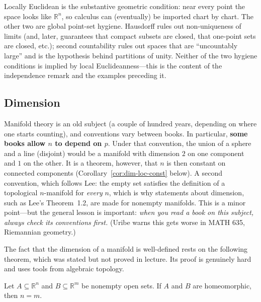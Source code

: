 \documentclass[11pt]{report}
\makeatletter
\newcounter{thmcounter}[section]
\newcommand{\thmlabel}[1]{\edef\@currentlabel{\arabic{section}.\arabic{thmcounter}}\label{#1}}
\newcommand{\leeref}[1]{\par\smallskip{\raggedleft\footnotesize\textsc{Lee}:\ #1\par}}
\makeatother
\begin{document}
\begin{rembox}\label{rem:why-these-three-conditions}
Locally Euclidean is the substantive geometric condition: near every point the space looks like $\mathbb{R}^n$, so calculus can (eventually) be imported chart by chart. The other two are global point-set hygiene. Hausdorff rules out non-uniqueness of limits (and, later, guarantees that compact subsets are closed, that one-point sets are closed, etc.); second countability rules out spaces that are ``uncountably large'' and is the hypothesis behind partitions of unity. Neither of the two hygiene conditions is implied by local Euclideanness---this is the content of the independence remark and the examples preceding it.
\end{rembox}

\subsection{Dimension}

\begin{rembox}\label{rem:conventions-dimension}
Manifold theory is an old subject (a couple of hundred years, depending on where one starts counting), and conventions vary between books. In particular, \textbf{some books allow $n$ to depend on $p$}. Under that convention, the union of a sphere and a line (disjoint) would be a manifold with dimension $2$ on one component and $1$ on the other. It is a theorem, however, that $n$ is then constant on connected components (Corollary~\ref{cor:dim-loc-const} below). A second convention, which follows Lee: the empty set satisfies the definition of a topological $n$-manifold for \emph{every} $n$, which is why statements about dimension, such as Lee's Theorem~1.2, are made for nonempty manifolds. This is a minor point---but the general lesson is important: \emph{when you read a book on this subject, always check its conventions first.} (Uribe warns this gets worse in MATH 635, Riemannian geometry.)
\end{rembox}

The fact that the dimension of a manifold is well-defined rests on the following theorem, which was stated but not proved in lecture. Its proof is genuinely hard and uses tools from algebraic topology.

\begin{thmbox}\thmlabel{thm:inv-dim}
Let $A \subseteq \mathbb{R}^n$ and $B \subseteq \mathbb{R}^m$ be nonempty open sets. If $A$ and $B$ are homeomorphic, then $n = m$.
\leeref{Theorem 1.2 (proved as Theorem 17.26)}
\end{thmbox}
\end{document}
